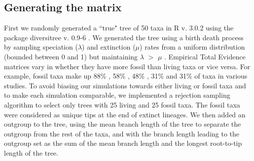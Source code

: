 \documentclass[12pt,letterpaper]{article}
\begin{document}

\subsection{Generating the matrix}
\label{Generating_the_matrix}
First we randomly generated a ``true" tree of 50 taxa in R v. 3.0.2 \citep{R302} using the package diversitree v. 0.9-6 \citep{fitzjohndiversitree2012}.
We generated the tree using a birth death process by sampling speciation ($\lambda$) and extinction ($\mu$) rates from a uniform distribution (bounded between 0 and 1) but maintaining $\lambda$ $>$ $\mu$ \citep{paradistime-dependent2011}.
Empirical Total Evidence matrices vary in whether they have more fossil than living taxa or vice versa.
For example, fossil taxa make up 88\% \citep{beckancient2014}, 58\% \citep{schragocombining2013}, 48\% \citep{pyrondivergence2011}, 31\% \citep{ronquista2012} and 31\% \citep{slaterphylogenetic2013} of taxa in various studies.
To avoid biasing our simulations towards either living or fossil taxa and to make each simulation comparable, we implemented a rejection sampling algorithm to select only trees with 25 living and 25 fossil taxa.
The fossil taxa were considered as unique tips at the end of extinct lineages.
We then added an outgroup to the tree, using the mean branch length of the tree to separate the outgroup from the rest of the taxa, and with the branch length leading to the outgroup set as the sum of the mean branch length and the longest root-to-tip length of the tree.
\end{document}
